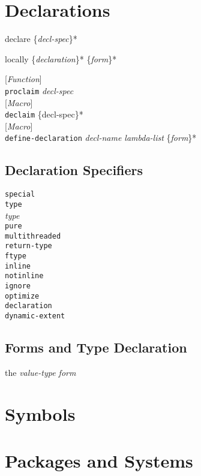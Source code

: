 \documentclass[10pt]{book}
\newenvironment{defother}[2]{[\textit{#1}]\\\texttt{#2}}{\\}
\newenvironment{defun}[1]{\begin{defother}{Function}{#1}}{\end{defother}}
\newenvironment{defmacro}[1]{\begin{defother}{Macro}{#1}}{\end{defother}}
\newenvironment{special-form}[1]{\begin{defother}{Special form}{#1}}{\end{defother}}
\begin{document}
\chapter{Declarations}
\begin{special-form}{declare} \{\textit{decl-spec}\}*\end{special-form}
\begin{special-form}{locally} \{\textit{declaration}\}* \{\textit{form}\}*\end{special-form}
\begin{defun}{proclaim} \textit{decl-spec}\end{defun}
\begin{defmacro}{declaim} \{decl-spec\}*\end{defmacro}
\begin{defmacro}{define-declaration} \textit{decl-name lambda-list} \{\textit{form}\}*\end{defmacro}
\section{Declaration Specifiers}
\texttt{special}\\
\texttt{type}\\
\textit{type}\\
\texttt{pure}\\
\texttt{multithreaded}\\
\texttt{return-type}\\
\texttt{ftype}\\
\texttt{inline}\\
\texttt{notinline}\\
\texttt{ignore}\\
\texttt{optimize}\\
\texttt{declaration}\\
\texttt{dynamic-extent}\\
\section{Forms and Type Declaration}
\begin{special-form}{the} \textit{value-type form}\end{special-form}
\chapter{Symbols}
\chapter{Packages and Systems} 
\end{document}
